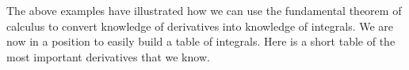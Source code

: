 \begin{eg}
\begin{comment}
\item For this example, the correct computation is
\begin{align*}
\int_{-1}^1\frac{1}{x^2}\dee{x}
&=\lim_{t\rightarrow 0^+}\int_{-1}^{-t}\frac{1}{x^2}\dee{x}
\ +\ \lim_{T\rightarrow 0^+}\int_{T}^{1}\frac{1}{x^2}\dee{x} \\[0.05in]
&=\lim_{t\rightarrow 0^+}\bigg[-\frac{1}{x}\bigg]_{-1}^{-t}
+\lim_{T\rightarrow 0^+}\bigg[-\frac{1}{x}\bigg]_{T}^1
               \displaybreak[0]\\[0.05in]
&=\lim_{t\rightarrow 0^+}
       \Big[\Big(-\frac{1}{-t}\Big)-\Big(-\frac{1}{-1}\Big)\Big]
+\lim_{T\rightarrow 0^+}
         \Big[\Big(-\frac{1}{1}\Big)-\Big(-\frac{1}{T}\Big)\Big]
               \displaybreak[0]\\[0.05in]
&=\lim_{t\rightarrow 0^+}\frac{1}{t}
  +\lim_{T\rightarrow 0^+}\frac{1}{T}-2 \\[0.05in]
&=+\infty
\end{align*}
\item We can interpret this to mean that the signed area under the curve $x^{-2}$ between
$x=-1$ and $x=1$ is infinite.
\end{itemize}
\end{comment}

\end{eg}

The above examples have illustrated how we can use the fundamental
theorem of calculus to convert knowledge of derivatives into
knowledge of integrals.
We are now in a position to easily build a table of integrals. Here is
a short table of the most important derivatives that we know.

